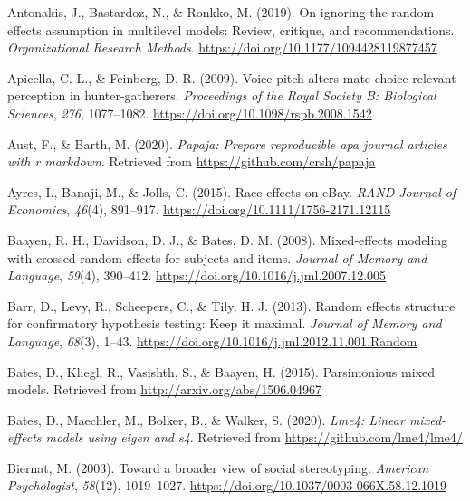 \documentclass[
  english,
  man, noextraspace,floatsintext]{apa6}
\newlength{\cslhangindent}
\newenvironment{cslreferences}%
  {\setlength{\parindent}{0pt}%
  \everypar{\setlength{\hangindent}{\cslhangindent}}\ignorespaces}%
  {\par}
\begin{document}
\hypertarget{refs}{}
\begin{cslreferences}
\leavevmode\hypertarget{ref-Antonakis2019}{}%
Antonakis, J., Bastardoz, N., \& Ronkko, M. (2019). On ignoring the random effects assumption in multilevel models: Review, critique, and recommendations. \emph{Organizational Research Methods}. \url{https://doi.org/10.1177/1094428119877457}

\leavevmode\hypertarget{ref-Apicella2009}{}%
Apicella, C. L., \& Feinberg, D. R. (2009). Voice pitch alters mate-choice-relevant perception in hunter-gatherers. \emph{Proceedings of the Royal Society B: Biological Sciences}, \emph{276}, 1077--1082. \url{https://doi.org/10.1098/rspb.2008.1542}

\leavevmode\hypertarget{ref-R-papaja}{}%
Aust, F., \& Barth, M. (2020). \emph{Papaja: Prepare reproducible apa journal articles with r markdown}. Retrieved from \url{https://github.com/crsh/papaja}

\leavevmode\hypertarget{ref-Ayres2015}{}%
Ayres, I., Banaji, M., \& Jolls, C. (2015). Race effects on eBay. \emph{RAND Journal of Economics}, \emph{46}(4), 891--917. \url{https://doi.org/10.1111/1756-2171.12115}

\leavevmode\hypertarget{ref-Baayen2008}{}%
Baayen, R. H., Davidson, D. J., \& Bates, D. M. (2008). Mixed-effects modeling with crossed random effects for subjects and items. \emph{Journal of Memory and Language}, \emph{59}(4), 390--412. \url{https://doi.org/10.1016/j.jml.2007.12.005}

\leavevmode\hypertarget{ref-Barr2013}{}%
Barr, D., Levy, R., Scheepers, C., \& Tily, H. J. (2013). Random effects structure for confirmatory hypothesis testing: Keep it maximal. \emph{Journal of Memory and Language}, \emph{68}(3), 1--43. \url{https://doi.org/10.1016/j.jml.2012.11.001.Random}

\leavevmode\hypertarget{ref-Bates2015}{}%
Bates, D., Kliegl, R., Vasishth, S., \& Baayen, H. (2015). Parsimonious mixed models. Retrieved from \url{http://arxiv.org/abs/1506.04967}

\leavevmode\hypertarget{ref-R-lme4}{}%
Bates, D., Maechler, M., Bolker, B., \& Walker, S. (2020). \emph{Lme4: Linear mixed-effects models using eigen and s4}. Retrieved from \url{https://github.com/lme4/lme4/}

\leavevmode\hypertarget{ref-Biernat2003}{}%
Biernat, M. (2003). Toward a broader view of social stereotyping. \emph{American Psychologist}, \emph{58}(12), 1019--1027. \url{https://doi.org/10.1037/0003-066X.58.12.1019}


\end{cslreferences}
\end{document}
